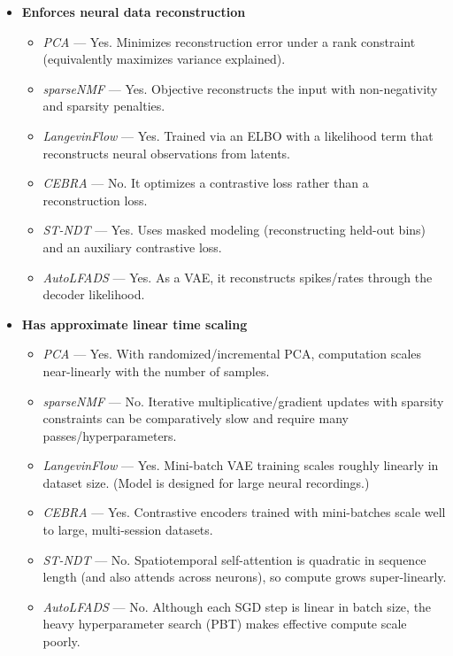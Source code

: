 \begin{itemize}
\item \textbf{Enforces neural data reconstruction}
    \begin{itemize}
    \item \textit{PCA} — Yes. Minimizes reconstruction error under a rank constraint (equivalently maximizes variance explained).
    \item \textit{sparseNMF} — Yes. Objective reconstructs the input with non-negativity and sparsity penalties.
    \item \textit{LangevinFlow} — Yes. Trained via an ELBO with a likelihood term that reconstructs neural observations from latents.
    \item \textit{CEBRA} — No. It optimizes a contrastive loss rather than a reconstruction loss.
    \item \textit{ST-NDT} — Yes. Uses masked modeling (reconstructing held-out bins) and an auxiliary contrastive loss.
    \item \textit{AutoLFADS} — Yes. As a VAE, it reconstructs spikes/rates through the decoder likelihood.
    \end{itemize}

\item \textbf{Has approximate linear time scaling}
    \begin{itemize}
    \item \textit{PCA} — Yes. With randomized/incremental PCA, computation scales near-linearly with the number of samples.
    \item \textit{sparseNMF} — No. Iterative multiplicative/gradient updates with sparsity constraints can be comparatively slow and require many passes/hyperparameters.
    \item \textit{LangevinFlow} — Yes. Mini-batch VAE training scales roughly linearly in dataset size. (Model is designed for large neural recordings.)
    \item \textit{CEBRA} — Yes. Contrastive encoders trained with mini-batches scale well to large, multi-session datasets.
    \item \textit{ST-NDT} — No. Spatiotemporal self-attention is quadratic in sequence length (and also attends across neurons), so compute grows super-linearly.
    \item \textit{AutoLFADS} — No. Although each SGD step is linear in batch size, the heavy hyperparameter search (PBT) makes effective compute scale poorly.
    \end{itemize}


\end{itemize}
